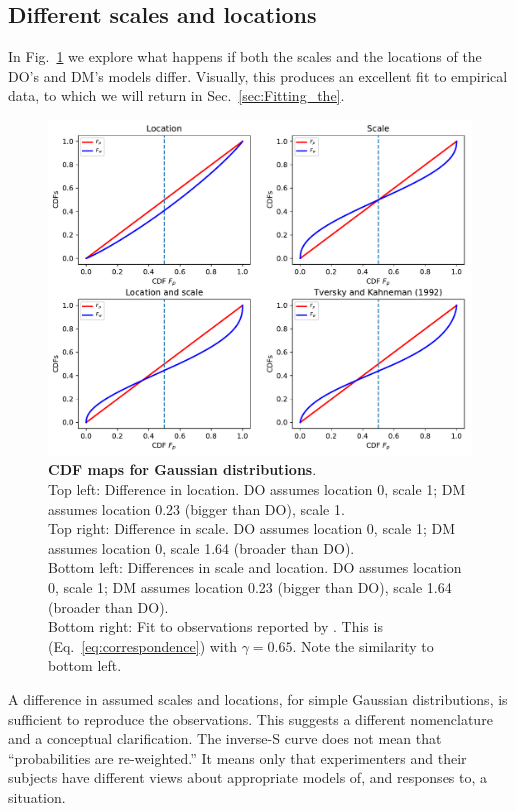 \documentclass[a4paper, 12pt]{article}
\newcommand{\eref}[1]{(Eq.~\ref{eq:#1})}
\newcommand{\flabel}[1]{\label{fig:#1}}
\newcommand{\fref}[1]{Fig.~\ref{fig:#1}}
\newcommand{\seclabel}[1]{\label{sec:#1}}
\newcommand{\secref}[1]{Sec.~\ref{sec:#1}}
\begin{document}
\subsection{Different scales and locations\seclabel{A_mismatch}}
In \fref{Gauss_scale_location_both_KT} we explore what happens if both the scales and the locations of the DO's and DM's models differ. Visually, this produces an excellent fit to empirical data, to which we will return in \secref{Fitting_the}.
\begin{figure}
\centering
\includegraphics[width=1.0\textwidth]{./figs/Gauss_scale_location_both_KT.pdf}
\caption{{\bf CDF maps for Gaussian distributions}.\\ 
Top left: Difference in location. DO assumes location 0, scale 1; DM assumes location 0.23 (bigger than DO), scale 1.\\
Top right: Difference in scale. DO assumes location 0, scale 1; DM assumes location 0, scale 1.64 (broader than DO).\\ 
Bottom left: Differences in scale and location. DO assumes location 0, scale 1; DM assumes location 0.23 (bigger than DO), scale 1.64 (broader than DO).\\ 
Bottom right: Fit to observations reported by \cite{TverskyKahneman1992}. This is \eref{correspondence} with $\gamma=0.65$.
Note the similarity to bottom left.}
\flabel{Gauss_scale_location_both_KT}
\end{figure}
A difference in assumed scales and locations, for simple Gaussian distributions, is sufficient to reproduce the observations. This suggests a different nomenclature and a conceptual clarification. The inverse-S curve does not mean that ``probabilities are re-weighted.'' It means only that experimenters and their subjects have different views about appropriate models of, and responses to, a situation. 
\end{document}
